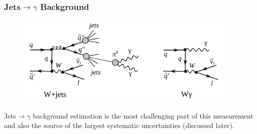 \begin{frame}\frametitle{Jets$\rightarrow \gamma$ Background}
\begin{figure}[htb]
  \begin{center}
    {\includegraphics[width=0.95\textwidth]{../figs/ForPresentation/feynmWjets.png}}
  \end{center}
\end{figure}
  \tiny
  Jets$\rightarrow \gamma$ background estimation is the most challenging part of this measurement and also the source of the largest systematic uncertainties (discussed later).
\end{frame}


